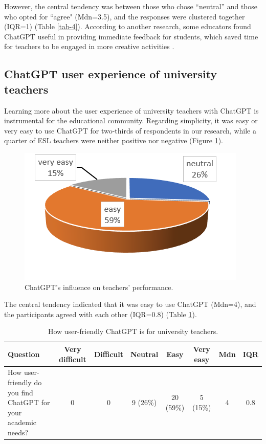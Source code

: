 \documentclass[english]{textolivre}
\begin{document}
However, the central tendency was between those who chose “neutral” and those who opted for ``agree" (Mdn=3.5), and the responses were clustered together (IQR=1) (Table \ref{tab-4}). According to another research, some educators found ChatGPT useful in providing immediate feedback for students, which saved time for teachers to be engaged in more creative activities \cite[p. 102]{iqbal2023}.

\subsection{ChatGPT user experience of university teachers}
Learning more about the user experience of university teachers with ChatGPT is instrumental for the educational community. Regarding simplicity, it was easy or very easy to use ChatGPT for two-thirds of respondents in our research, while a quarter of ESL teachers were neither positive nor negative (Figure \ref{fig-9}).

\begin{figure}[h!]
    \centering
    \begin{minipage}{0.65\linewidth}
    \includegraphics[width=\linewidth]{Imagens/Figure9.png}
    \caption{ChatGPT’s influence on teachers’ performance.}
    \label{fig-9}
    \end{minipage}
\end{figure}

The central tendency indicated that it was easy to use ChatGPT (Mdn=4), and the participants agreed with each other (IQR=0.8) (Table \ref{tab-5}).

\begin{table}[h!]
\centering
\caption{How user-friendly ChatGPT is for university teachers.}\label{tab-5}
\begin{tabularx}{\textwidth}{@{}Xccccc cc@{}}
\toprule
Question & Very difficult & Difficult & Neutral & Easy & Very easy & Mdn & IQR \\
\midrule
How user-friendly do you find ChatGPT for your academic needs? & 0 & 0 & 9 (26\%) & 20 (59\%) & 5 (15\%) & 4 & 0.8 \\
\bottomrule
\end{tabularx}
\end{table}
\end{document}
